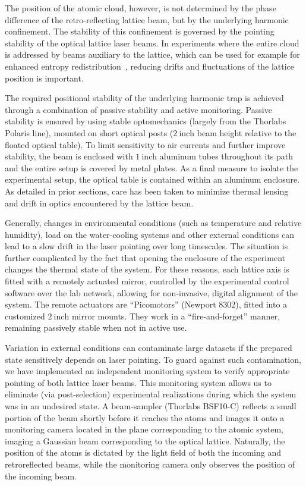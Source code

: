 \documentclass[twocolumn,aps,pra,showpacs,preprintnumbers,bibnotes]{revtex4-1}
\newcommand\unit[2]{\ensuremath{#1~\mathrm{{#2}}}}
\begin{document}
The position of the atomic cloud, however, is not determined by the phase difference of the retro-reflecting lattice beam, but by the underlying harmonic confinement.
The stability of this confinement is governed by the pointing stability of the optical lattice laser beams.
In experiments where the entire cloud is addressed by beams auxiliary to the lattice, which can be used for example for enhanced entropy redistribution~\cite{Mazurenko2017}, reducing drifts and fluctuations of the lattice position is important.

The required positional stability of the underlying harmonic trap is achieved through a combination of passive stability and active monitoring.
Passive stability is ensured by using stable optomechanics (largely from the Thorlabs Polaris line), mounted on short optical posts (\unit{2}{inch} beam height relative to the floated optical table).
To limit sensitivity to air currents and further improve stability, the beam is enclosed with \unit{1}{inch} aluminum tubes throughout its path and the entire setup is covered by metal plates.
As a final measure to isolate the experimental setup, the optical table is contained within an aluminum enclosure. As detailed in prior sections, care has been taken to minimize thermal lensing and drift in optics encountered by the lattice beam.

Generally, changes in environmental conditions (such as temperature and relative humidity), load on the water-cooling systems and other external conditions can lead to a slow drift in the laser pointing over long timescales.
The situation is further complicated by the fact that opening the enclosure of the experiment changes the thermal state of the system.
For these reasons, each lattice axis is fitted with a remotely actuated mirror, controlled by the experimental control software over the lab network, allowing for non-invasive, digital alignment of the system.
The remote actuators are ``Picomotors'' (Newport 8302), fitted into a customized \unit{2}{inch} mirror mounts.
They work in a ``fire-and-forget'' manner, remaining passively stable when not in active use.

Variation in external conditions can contaminate large datasets if the prepared state sensitively depends on laser pointing.
To guard against such contamination, we have implemented an independent monitoring system to verify appropriate pointing of both lattice laser beams.
This monitoring system allows us to eliminate (via post-selection) experimental realizations during which the system was in an undesired state.
A beam-sampler (Thorlabs BSF10-C) reflects a small portion of the beam shortly before it reaches the atoms and images it onto a monitoring camera located in the plane corresponding to the atomic system, imaging a Gaussian beam corresponding to the optical lattice.
Naturally, the position of the atoms is dictated by the light field of both the incoming and retroreflected beams, while the monitoring camera only observes the position of the incoming beam.
\end{document}
